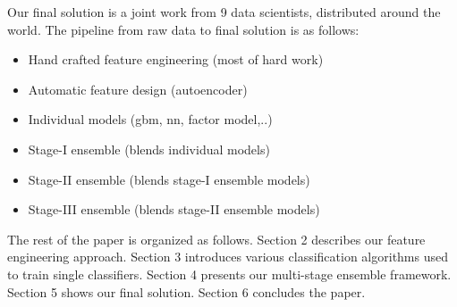 Our final solution is a joint work from 9 data scientists, distributed around the world.
The pipeline from raw data to final solution is as follows:
\begin{itemize}
  \setlength\itemsep{0em}
  \item Hand crafted feature engineering (most of hard work)
  \item Automatic feature design (autoencoder)
  \item Individual models (gbm, nn, factor model,..)
  \item Stage-I ensemble (blends individual models)
  \item Stage-II ensemble (blends stage-I ensemble models)
  \item Stage-III ensemble (blends stage-II ensemble models)
\end{itemize}

The rest of the paper is organized as follows. Section 2 describes our feature engineering approach. Section 3 introduces various classification algorithms used to train single classifiers. Section 4 presents our multi-stage ensemble framework. Section 5 shows our final solution. Section 6 concludes the paper.

